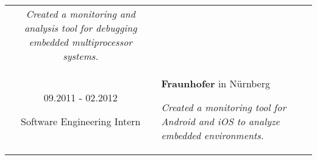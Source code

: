 \documentclass[10pt]{article}
\begin{document}
\begin{tabular}{C Z D}
{		\vspace{0.05cm}
		
		{\scriptsize \it Created a monitoring and analysis tool for debugging embedded multiprocessor systems.}
		
		\vspace{0.0cm}
	}
	\\
	{
		09.2011 - 02.2012
		
		\vspace{-0.05cm}
		
		{\scriptsize \parbox{4.0cm}{Software Engineering Intern}}
	}
	&
	{	
		{\bf Fraunhofer} {\scriptsize in N{\"u}rnberg}
		
		\vspace{0.05cm}
		
		{\scriptsize \it Created a monitoring tool for Android and iOS to analyze embedded environments.}
	}
	\\
\end{tabular}
\end{document}
